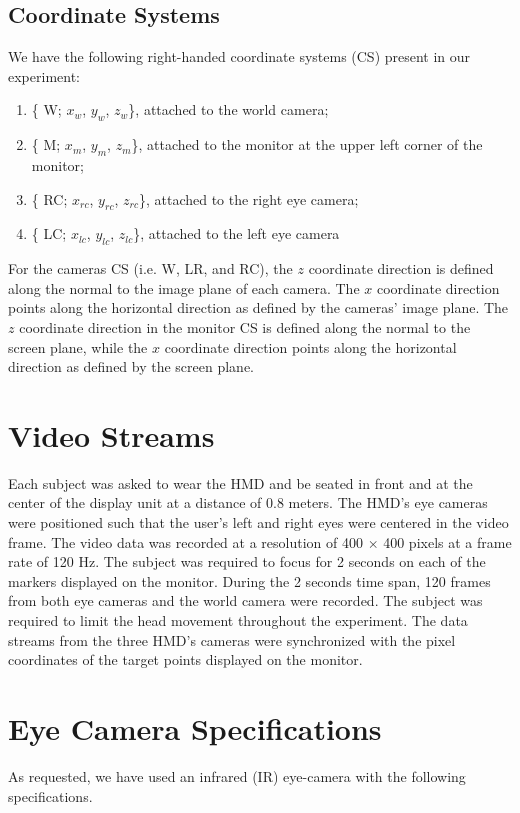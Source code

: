 \documentclass{article}
\begin{document}
\subsection{Coordinate Systems}
We have the following right-handed coordinate systems (CS) present in our experiment:
\begin{enumerate}[label=(\alph*)]
    \item \{ W; $x_w$, $y_w$, $z_w$\}, attached to the world camera;
    \item \{ M; $x_m$, $y_m$, $z_m$\}, attached to the monitor at the upper left corner of the monitor;
    \item \{ RC; $x_{rc}$, $y_{rc}$, $z_{rc}$\}, attached to the right eye camera;
    \item \{ LC; $x_{lc}$, $y_{lc}$, $z_{lc}$\}, attached to the left eye camera
\end{enumerate}

For the cameras CS (i.e. W, LR, and RC), the $z$ coordinate direction is defined along the normal to the image plane of each camera. The $x$ coordinate direction points along the horizontal direction as defined by the cameras' image plane.  The $z$ coordinate direction in the monitor CS is defined along the normal to the screen plane, while the $x$ coordinate direction points along the horizontal direction as defined by the screen plane.

\section{Video Streams}
Each subject was asked to wear the HMD and be seated in front and at the center of the display unit at a distance of 0.8 meters. The HMD's eye cameras were positioned such that the user’s left and right eyes were centered in the video frame.  The video data was recorded at a resolution of 400 $\times$ 400 pixels at a frame rate of 120 Hz. The subject was required to focus for 2 seconds on each of the markers displayed on the monitor.  During the 2 seconds time span, 120 frames from both eye cameras and the world camera were recorded.  The subject was required to limit the head movement throughout the experiment.  The data streams from the three HMD's cameras were synchronized with the pixel coordinates of the target points displayed on the monitor.

\section{Eye Camera Specifications}
As requested, we have used an infrared (IR) eye-camera with the following specifications. 
\end{document}
